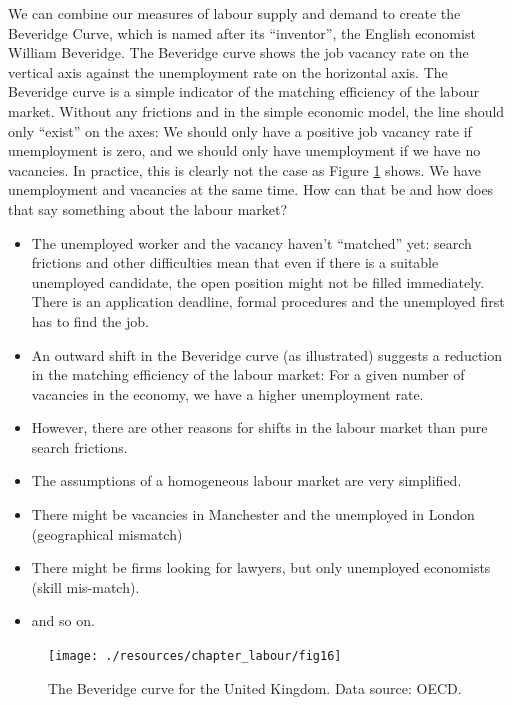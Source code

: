\documentclass[
]{book}
\begin{document}
We can combine our measures of labour supply and demand to create the Beveridge Curve, which is named after its ``inventor'', the English economist William Beveridge. The Beveridge curve shows the job vacancy rate on the vertical axis against the unemployment rate on the horizontal axis. The Beveridge curve is a simple indicator of the matching efficiency of the labour market. Without any frictions and in the simple economic model, the line should only ``exist'' on the axes: We should only have a positive job vacancy rate if unemployment is zero, and we should only have unemployment if we have no vacancies. In practice, this is clearly not the case as Figure \ref{fig:labour4} shows. We have unemployment and vacancies at the same time. How can that be and how does that say something about the labour market?

\begin{itemize}
\item
  The unemployed worker and the vacancy haven't ``matched'' yet: search frictions and other difficulties mean that even if there is a suitable unemployed candidate, the open position might not be filled immediately. There is an application deadline, formal procedures and the unemployed first has to find the job.
\item
  An outward shift in the Beveridge curve (as illustrated) suggests a reduction in the matching efficiency of the labour market: For a given number of vacancies in the economy, we have a higher unemployment rate.
\item
  However, there are other reasons for shifts in the labour market than pure search frictions.
\item
  The assumptions of a homogeneous labour market are very simplified.
\item
  There might be vacancies in Manchester and the unemployed in London (geographical mismatch)
\item
  There might be firms looking for lawyers, but only unemployed economists (skill mis-match).
\item
  and so on.
\end{itemize}

\begin{figure}

{\centering \texttt{[image: ./resources/chapter\_labour/fig16]} 

}

\caption{The Beveridge curve for the United Kingdom. Data source: OECD. }\label{fig:labour4}
\end{figure}
\end{document}
